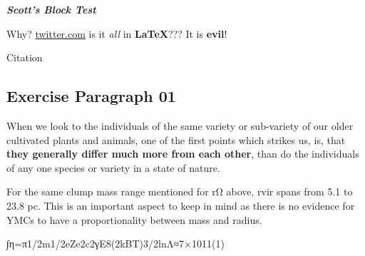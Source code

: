 \textit{\textbf{Scott's Block Test}} 

Why? \href{Why}{twitter.com} is it \textit{all} in \textbf{LaTeX}??? It is \textbf{evil}!

Citation\cite{Ferry_2006}

\subsection{Exercise Paragraph 01}

When we look to the individuals of the same variety or sub-variety of our older cultivated plants and animals, one of the first points which strikes us, is, that \textbf{they generally differ much more from each other}, than do the individuals of any one species or variety in a state of nature.

For the same clump mass range mentioned for rΩ above, rvir spans from 5.1 to 23.8 pc. This is an important aspect to keep in mind as there is no evidence for YMCs to have a proportionality between mass and radius. \cite{Angell_2013}

∫η=π1/2m1/2eZe2c2γE8(2kBT)3/2lnΛ≈7×1011(1)

